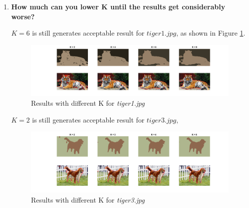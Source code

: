 \documentclass{article}
\begin{document}
\begin{enumerate}
\begin{enumerate}
    \end{enumerate}
    
    \item %
    \textbf{How much can you lower K until the results get considerably worse?}
    \par
    $K = 6$ is still generates acceptable result for $tiger1.jpg$, as shown in Figure \ref{fig:5121}.
   \begin{figure}[H]
        \centering
        \includegraphics[width=1.2\linewidth]{graphcut_K1.png}
        \caption{Results with different K for \textit{tiger1.jpg}}
        \label{fig:5121}
    \end{figure}  
    \par $K = 2$ is still generates acceptable result for $tiger3.jpg$, 
    
    \begin{figure}[H]
        \centering
        \includegraphics[width=1.2\linewidth]{graphcut_K3.png}
        \caption{Results with different K for \textit{tiger3.jpg}}
        \label{fig:5122}
    \end{figure}  
    

\end{enumerate}
\end{document}
